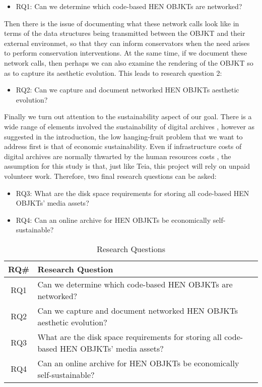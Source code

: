 \begin{itemize}
	\item RQ1: Can we determine which code-based HEN OBJKTs are networked?
\end{itemize}

Then there is the issue of documenting what these network calls look like in terms of the data structures being transmitted between the OBJKT and their external environmet, so that they can inform conservators when the need arises to perform conservation interventions. At the same time, if we document these network calls, then perhaps we can also examine the rendering of the OBJKT so as to capture its aesthetic evolution. This leads to research question 2:

\begin{itemize}
	\item RQ2: Can we capture and document networked HEN OBJKTs aesthetic evolution?
\end{itemize}

Finally we turn out attention to the sustainability aspect of our goal. There is a wide range of elements involved the sustainability of digital archives \cite{visDigitalArchivingSustainable2024}, however as suggested in the introduction, the low hanging-fruit problem that we want to address first is that of economic sustainability. Even if infrastructure costs of digital archives are normally thwarted by the human resources costs \cite{CostsDigitalRepositories}, the assumption for this study is that, just like Teia, this project will rely on unpaid volunteer work. Therefore, two final research questions can be asked: 

\begin{itemize}
	\item RQ3: What are the disk space requirements for storing all code-based HEN OBJKTs' media assets?
	\item RQ4: Can an online archive for HEN OBJKTs be economically self-sustainable?
\end{itemize}

\vspace{0.5cm}

\begin{table}[h!]
\centering
\footnotesize
\begin{tabular}{|c|p{10cm}|}
\hline
\textbf{RQ\#} & \textbf{Research Question} \\ \hline
RQ1 & Can we determine which code-based HEN OBJKTs are networked? \\ \hline
RQ2 & Can we capture and document networked HEN OBJKTs aesthetic evolution? \\ \hline
RQ3 & What are the disk space requirements for storing all code-based HEN OBJKTs' media assets? \\ \hline
RQ4 & Can an online archive for HEN OBJKTs be economically self-sustainable? \\ \hline
\end{tabular}
\caption{Research Questions}
\end{table}


